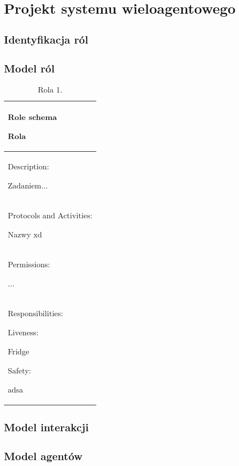 \newpage
\section{Projekt systemu wieloagentowego}

\subsection{Identyfikacja ról}

\subsection{Model ról}

\begin{table}[!h] \label{tab:rola1} \centering
\caption{Rola 1.}
\begin{tabular} {| p{14cm} |} \hline
    Role schema
    
    \hspace{5mm} Rola \\ \hline
    Description:

    \hspace{5mm} Zadaniem... \\ \hline
    Protocols and Activities:

    \hspace{5mm} Nazwy xd \\ \hline
    Permissions:

    \hspace{5mm} ... \\ \hline
    Responsibilities:

    Liveness:

    \hspace{1cm} Fridge

    Safety:

    \hspace{5mm} adsa \\ \hline


\end{tabular}
\end{table}

\subsection{Model interakcji}

\subsection{Model agentów}

